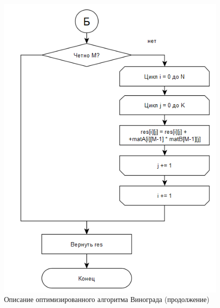 \documentclass{article}
\begin{document}
\begin{figure}[h]
	\centering
	\includegraphics[scale=1]{tools/alg_3_1.png}
	\caption{Описание оптимизированного алгоритма Винограда (продолжение)}
	\label{fig:opt_vinograd_2}
\end{figure}
\end{document}
